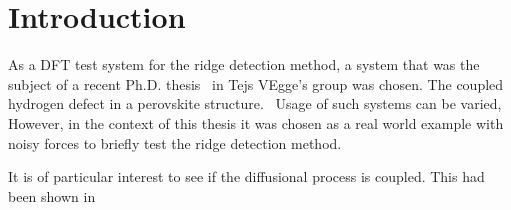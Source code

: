 \section{Introduction}
\label{sec:perovskites-introduction}

As a DFT test system for the ridge detection method, a system that was the subject of a recent Ph.D. thesis~\cite{nicolai-2010} in Tejs VEgge's group was chosen.
The coupled hydrogen defect in a  perovskite structure.~\cite{double-defect-2011}
Usage of such systems can be varied, \expand
However, in the context of this thesis it was chosen as a real world example with noisy forces to briefly test the ridge detection method.

It is of particular interest to see if the diffusional process is coupled.
This had been shown in \cite{double-defect-2011} \expand



